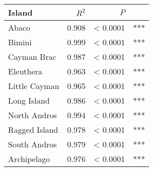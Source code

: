 
\begin{tabular}{lrrl}
\toprule
Island & $R^2$ & $P$ & \\
\midrule
Abaco & 0.908 & < 0.0001 & ***\\
Bimini & 0.999 & < 0.0001 & ***\\
Cayman Brac & 0.987 & < 0.0001 & ***\\
Eleuthera & 0.963 & < 0.0001 & ***\\
Little Cayman & 0.965 & < 0.0001 & ***\\
Long Island & 0.986 & < 0.0001 & ***\\
North Andros & 0.994 & < 0.0001 & ***\\
Ragged Island & 0.978 & < 0.0001 & ***\\
South Andros & 0.979 & < 0.0001 & ***\\
Archipelago & 0.976 & < 0.0001 & ***\\
\bottomrule
\end{tabular}
